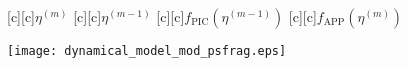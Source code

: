 \documentclass{article}
\begin{document}
\begin{figure}[htb]
  \begin{center}


        [c][c]{$\eta^{(m)}$}
        [c][c]{\hspace{2mm}$\eta^{(m-1)}$}
        [c][c]{$f_{\mathrm{PIC}}(\eta^{(m-1)})$}
        [c][c]{\hspace{0.5mm}$f_{\mathrm{APP}}(\eta^{(m)})$}

    \texttt{[image: dynamical\_model\_mod\_psfrag.eps]}
    \end{center}
\end{figure}
\end{document}
